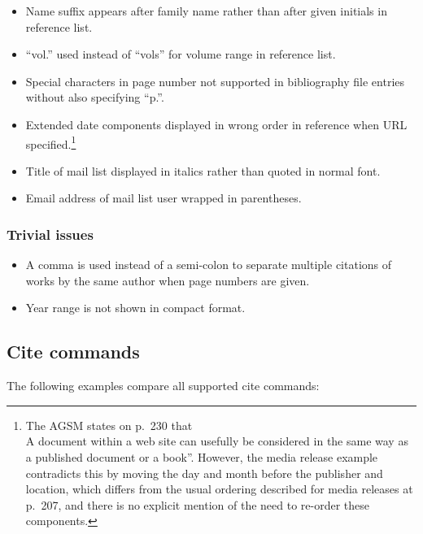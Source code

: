 \documentclass[a4paper,landscape,12pt]{article}
\newlength\q
\begin{document}
\begin{itemize}
	\item Name suffix appears after family name rather than after given initials in reference list.
	\item ``vol.'' used instead of ``vols'' for volume range in reference list.
	\item Special characters in page number not supported in bibliography file entries without also specifying ``p.''.
	\item Extended date components displayed in wrong order in reference when URL specified.\footnote{The AGSM states on p.~230 that \\A document within a web site can usefully be considered in the same way as a published document or a book''.  However, the media release example contradicts this by moving the day and month before the publisher and location, which differs from the usual ordering described for media releases at p.~207, and there is no explicit mention of the need to re-order these components.}
	\item Title of mail list displayed in italics rather than quoted in normal font.
	\item Email address of mail list user wrapped in parentheses.
\end{itemize}

\subsubsection{Trivial issues}

\begin{itemize}
	\item A comma is used instead of a semi-colon to separate multiple citations of works by the same author when page numbers are given.
	\item Year range is not shown in compact format.
\end{itemize}

\clearpage
\subsection{Cite commands}

The following examples compare all supported cite commands:
\end{document}
